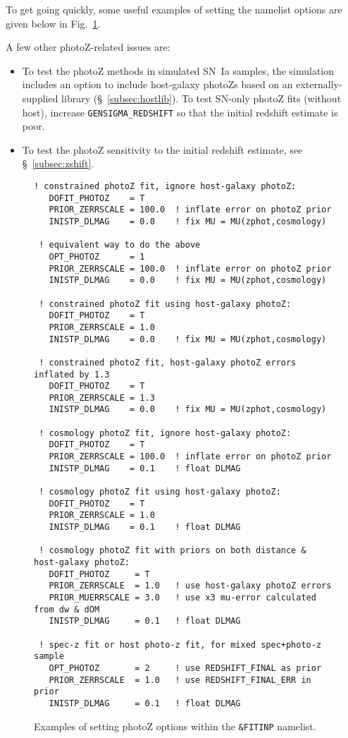 \documentclass[12pt]{article}
\begin{document}
To get going quickly, some useful examples of setting
the namelist options are given below in Fig.~\ref{fig:photoZ}.


\bigskip
A few other photoZ-related issues are:
\begin{itemize}
  \item	To test the photoZ methods in simulated SN~Ia samples,
	the simulation includes an option to include host-galaxy 
	photoZs based on an externally-supplied library 
	(\S~\ref{subsec:hostlib}). To test SN-only photoZ
	fits (without host), increase {\tt GENSIGMA\_REDSHIFT}
	so that the initial redshift estimate is poor.
%
\item	To test the photoZ sensitivity to the initial redshift estimate,
        see \S~\ref{subsec:zshift}.
\end{itemize}


\begin{figure}[hb] 
\begin{center}
\caption{
  Examples of setting photoZ options within the
  {\tt \&FITINP} namelist.
 }
\label{fig:photoZ}
%
\begin{Verbatim}[frame=single]
 ! constrained photoZ fit, ignore host-galaxy photoZ:
   DOFIT_PHOTOZ    = T
   PRIOR_ZERRSCALE = 100.0  ! inflate error on photoZ prior
   INISTP_DLMAG    = 0.0    ! fix MU = MU(zphot,cosmology)

 ! equivalent way to do the above
   OPT_PHOTOZ      = 1
   PRIOR_ZERRSCALE = 100.0  ! inflate error on photoZ prior
   INISTP_DLMAG    = 0.0    ! fix MU = MU(zphot,cosmology)

 ! constrained photoZ fit using host-galaxy photoZ:
   DOFIT_PHOTOZ    = T
   PRIOR_ZERRSCALE = 1.0
   INISTP_DLMAG    = 0.0    ! fix MU = MU(zphot,cosmology)

 ! constrained photoZ fit, host-galaxy photoZ errors inflated by 1.3
   DOFIT_PHOTOZ    = T
   PRIOR_ZERRSCALE = 1.3
   INISTP_DLMAG    = 0.0    ! fix MU = MU(zphot,cosmology)

 ! cosmology photoZ fit, ignore host-galaxy photoZ:
   DOFIT_PHOTOZ    = T
   PRIOR_ZERRSCALE = 100.0  ! inflate error on photoZ prior
   INISTP_DLMAG    = 0.1    ! float DLMAG

 ! cosmology photoZ fit using host-galaxy photoZ:
   DOFIT_PHOTOZ    = T
   PRIOR_ZERRSCALE = 1.0   
   INISTP_DLMAG    = 0.1    ! float DLMAG

 ! cosmology photoZ fit with priors on both distance & host-galaxy photoZ:
   DOFIT_PHOTOZ     = T
   PRIOR_ZERRSCALE  = 1.0   ! use host-galaxy photoZ errors   
   PRIOR_MUERRSCALE = 3.0   ! use x3 mu-error calculated from dw & dOM
   INISTP_DLMAG     = 0.1   ! float DLMAG

 ! spec-z fit or host photo-z fit, for mixed spec+photo-z sample
   OPT_PHOTOZ       = 2     ! use REDSHIFT_FINAL as prior
   PRIOR_ZERRSCALE  = 1.0   ! use REDSHIFT_FINAL_ERR in prior
   INISTP_DLMAG     = 0.1   ! float DLMAG
\end{Verbatim}
\end{center}
\end{figure}
\end{document}
